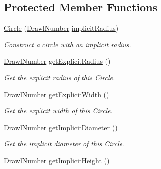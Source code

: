 \subsection*{Protected Member Functions}
\begin{DoxyCompactItemize}
\item 
\hyperlink{classcom_1_1aarrelaakso_1_1drawl_1_1_circle_aea0d67593f2077987e7258ed2adb57c5}{Circle} (\hyperlink{classcom_1_1aarrelaakso_1_1drawl_1_1_drawl_number}{Drawl\+Number} \hyperlink{classcom_1_1aarrelaakso_1_1drawl_1_1_circle_afb7f13978788e711c490cec96e9f899a}{implicit\+Radius})
\begin{DoxyCompactList}\small\item\em Construct a circle with an implicit radius. \end{DoxyCompactList}\item 
\hyperlink{classcom_1_1aarrelaakso_1_1drawl_1_1_drawl_number}{Drawl\+Number} \hyperlink{classcom_1_1aarrelaakso_1_1drawl_1_1_circle_a86dad8314ef32e7561087b43cfcba25a}{get\+Explicit\+Radius} ()
\begin{DoxyCompactList}\small\item\em Get the explicit radius of this \hyperlink{classcom_1_1aarrelaakso_1_1drawl_1_1_circle}{Circle}. \end{DoxyCompactList}\item 
\hyperlink{classcom_1_1aarrelaakso_1_1drawl_1_1_drawl_number}{Drawl\+Number} \hyperlink{classcom_1_1aarrelaakso_1_1drawl_1_1_circle_af02bae455881ed2a1570366a2b63c90b}{get\+Explicit\+Width} ()
\begin{DoxyCompactList}\small\item\em Get the explicit width of this \hyperlink{classcom_1_1aarrelaakso_1_1drawl_1_1_circle}{Circle}. \end{DoxyCompactList}\item 
\hyperlink{classcom_1_1aarrelaakso_1_1drawl_1_1_drawl_number}{Drawl\+Number} \hyperlink{classcom_1_1aarrelaakso_1_1drawl_1_1_circle_aa94aa289fa6a02523cceb0a7d46c1115}{get\+Implicit\+Diameter} ()
\begin{DoxyCompactList}\small\item\em Get the implicit diameter of this \hyperlink{classcom_1_1aarrelaakso_1_1drawl_1_1_circle}{Circle}. \end{DoxyCompactList}\item 
\hyperlink{classcom_1_1aarrelaakso_1_1drawl_1_1_drawl_number}{Drawl\+Number} \hyperlink{classcom_1_1aarrelaakso_1_1drawl_1_1_circle_a866cede87fd3253b3e4f93d9970717c3}{get\+Implicit\+Height} ()

\end{DoxyCompactItemize}
